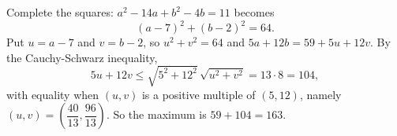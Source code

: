 Complete the squares: $a^2-14a+b^2-4b=11$ becomes
\[
(a-7)^2+(b-2)^2=64 .
\]
Put $u=a-7$ and $v=b-2$, so $u^2+v^2=64$ and $5a+12b=59+5u+12v$. By the Cauchy-Schwarz inequality,
\[
5u+12v\le\sqrt{5^2+12^2}\,\sqrt{u^2+v^2}=13\cdot8=104,
\]
with equality when $(u,v)$ is a positive multiple of $(5,12)$, namely $(u,v)=\left(\dfrac{40}{13},\dfrac{96}{13}\right)$. So the maximum is $59+104=\boxed{163}$.

